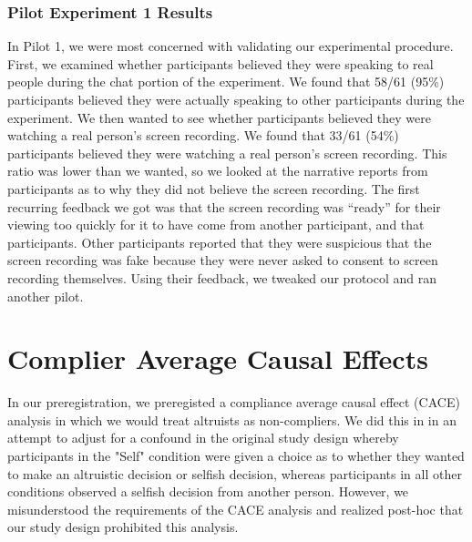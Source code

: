 \documentclass[12pt,]{article}
\begin{document}
 \subsubsection{Pilot Experiment 1 Results}
\label{appendix:px1_results}

In Pilot 1, we were most concerned with validating our experimental procedure. First, we examined whether participants believed they were speaking to real people during the chat portion of the experiment. We found that 58/61 (95\%) participants believed they were actually speaking to other participants during the experiment. We then wanted to see whether participants believed they were watching a real person’s screen recording. We found that 33/61 (54\%) participants believed they were watching a real person’s screen recording. This ratio was lower than we wanted, so we looked at the narrative reports from participants as to why they did not believe the screen recording. The first recurring feedback we got was that the screen recording was “ready” for their viewing too quickly for it to have come from another participant, and that participants. Other participants reported that they were suspicious that the screen recording was fake because they were never asked to consent to screen recording themselves. Using their feedback, we tweaked our protocol and ran another pilot. 




\clearpage
\section{Complier Average Causal Effects}
\label{appendix:CACE}

In our preregistration, we preregisted a compliance average causal effect (CACE) analysis in which we would treat altruists as non-compliers. We did this in in an attempt to adjust for a confound in the original study design whereby participants in the "Self" condition were given a choice as to whether they wanted to make an altruistic decision or selfish decision, whereas participants in all other conditions observed a selfish decision from another person. However, we misunderstood the requirements of the CACE analysis and realized post-hoc that our study design prohibited this analysis. 
\end{document}
